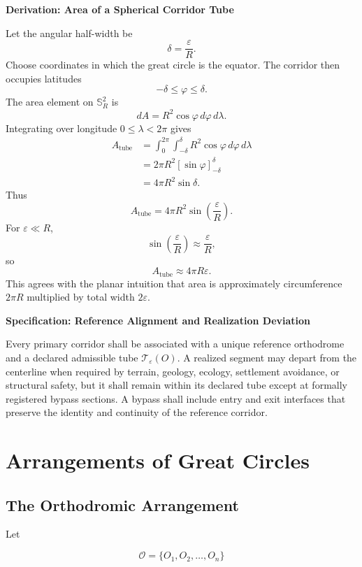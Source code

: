 \documentclass[11pt,fleqn]{book}
\numberwithin{equation}{chapter}
\newenvironment{specification}[1]
  {\begin{specificationEnv}
   \noindent\textbf{Specification: #1}\par\smallskip}
  {\end{specificationEnv}}
\newenvironment{derivation}[1]
  {\begin{derivationEnv}
   \noindent\textbf{Derivation: #1}\par\smallskip}
  {\end{derivationEnv}}
\theoremstyle{plain}
\theoremstyle{definition}
\theoremstyle{remark}
\newcommand{\Sphere}{\mathbb{S}^{2}}
\newcommand{\Oset}{\mathcal{O}}
\begin{document}
\begin{derivation}{Area of a Spherical Corridor Tube}
Let the angular half-width be
\[
\delta=\frac{\varepsilon}{R}.
\]
Choose coordinates in which the great circle is the equator. The corridor then occupies latitudes
\[
-\delta\leq\varphi\leq\delta.
\]
The area element on \(\Sphere_R\) is
\[
dA=R^2\cos\varphi\,d\varphi\,d\lambda.
\]
Integrating over longitude \(0\leq\lambda<2\pi\) gives
\begin{align}
A_{\mathrm{tube}}
&=
\int_0^{2\pi}
\int_{-\delta}^{\delta}
R^2\cos\varphi
\,d\varphi\,d\lambda
\\
&=
2\pi R^2
\left[
\sin\varphi
\right]_{-\delta}^{\delta}
\\
&=
4\pi R^2\sin\delta.
\end{align}
Thus
\[
A_{\mathrm{tube}}
=
4\pi R^2
\sin\left(\frac{\varepsilon}{R}\right).
\]
For \(\varepsilon\ll R\),
\[
\sin\left(\frac{\varepsilon}{R}\right)
\approx
\frac{\varepsilon}{R},
\]
so
\[
A_{\mathrm{tube}}
\approx
4\pi R\varepsilon.
\]
This agrees with the planar intuition that area is approximately circumference \(2\pi R\) multiplied by total width \(2\varepsilon\).
\end{derivation}

\begin{specification}{Reference Alignment and Realization Deviation}
Every primary corridor shall be associated with a unique reference orthodrome and a declared admissible tube \(\mathcal{T}_{\varepsilon}(O)\). A realized segment may depart from the centerline when required by terrain, geology, ecology, settlement avoidance, or structural safety, but it shall remain within its declared tube except at formally registered bypass sections. A bypass shall include entry and exit interfaces that preserve the identity and continuity of the reference corridor.
\end{specification}

\chapter{Arrangements of Great Circles}

\section{The Orthodromic Arrangement}

Let

\begin{equation}
    \Oset
    =
    \{O_1,O_2,\dots,O_n\}
\end{equation}
\end{document}
